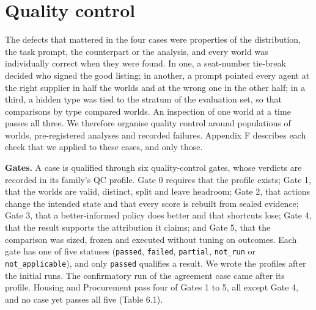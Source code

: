 \section{Quality control}\label{quality-control}\label{sec:qc}

The defects that mattered in the four cases were properties of the distribution, the task prompt, the
counterpart or the analysis, and every world was individually correct when they were found. In one, a
seat-number tie-break decided who signed the good listing; in another, a prompt pointed
every agent at the right supplier in half the worlds and at the wrong one in the other half; in a third,
a hidden type was tied to the stratum of the evaluation set, so that comparisons by type compared worlds.
An inspection of one world at a time passes all three. We therefore organise quality control
around populations of worlds, pre-registered analyses and recorded failures. Appendix F describes each
check that we applied to these cases, and only those.

\textbf{Gates.} A case is qualified through six quality-control gates, whose verdicts are recorded in its family's QC
profile. Gate 0 requires that the profile exists; Gate 1, that the worlds are valid, distinct, split and leave headroom;
Gate 2, that actions change the intended state and that every score is rebuilt from sealed evidence; Gate 3, that a
better-informed policy does better and that shortcuts lose; Gate 4, that the result supports the attribution it claims;
and Gate 5, that the comparison was sized, frozen and executed without tuning on outcomes. Each gate has one of five
statuses (\texttt{passed}, \texttt{failed}, \texttt{partial}, \texttt{not\_run} or \texttt{not\_\allowbreak{}applicable}), and only \texttt{passed} qualifies a result. We wrote
the profiles after the initial runs. The confirmatory run of the agreement case came after its profile. Housing and
Procurement pass four of Gates 1 to 5, all except Gate 4, and no case yet passes all five (Table 6.1).

